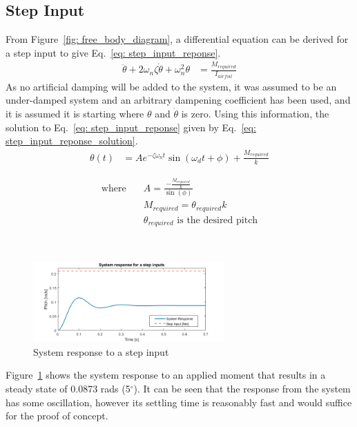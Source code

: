             \subsection{Step Input}
            From Figure~\ref{fig: free_body_diagram}, a differential equation can be derived for a step input to give Eq.~\ref*{eq: step_input_reponse}.
            \begin{align}
                \ddot{\theta} +2\omega_{n}\zeta\dot{\theta} + \omega _{n}^2 \theta &= \frac{M_{required}}{I_{airfoil}} \label{eq: step_input_reponse}
            \end{align}
            As no artificial damping will be added to the system, it was assumed to be an under-damped system and an arbitrary dampening coefficient has been used, and it is assumed it is starting where \(\theta\) and \(\dot{\theta}\) is zero. Using this information, the solution to Eq.~\ref{eq: step_input_reponse} given by Eq.~\ref{eq: step_input_reponse_solution}.
            \begin{align}
                \theta(t) &= Ae^{-\zeta \omega_n t}\sin(\omega_d t +\phi) + \frac{M_{required}}{k} \label{eq: step_input_reponse_solution}
            \end{align}
            \begin{minipage}{0.45\textwidth}
                \vspace*{-4mm}
                \begin{align*}
                    \text{where} \quad
                    &A = \frac{-\frac{M_{required}}{k}}{\sin(\phi)} \\
                    &M_{required} = \theta_{required}k\\
                    &\theta_{required} \text{ is the desired pitch}
                \end{align*}
                \end{minipage}
                \\
                \begin{figure}[h]
                    \centering
                    \includegraphics*[width = 0.65\textwidth]{figs/Model/Pitch/System_response _for _step_input.png}
                    \caption{System response to a step input}
                    \label{fig: step_response}
                \end{figure}
                Figure~\ref{fig: step_response} shows the system response to an applied moment that results in a steady state of 0.0873 rads (5\(^\circ\)). It can be seen that the response from the system has some oscillation, however its settling time is reasonably fast and would suffice for the proof of concept.
                \vspace{-5mm}
